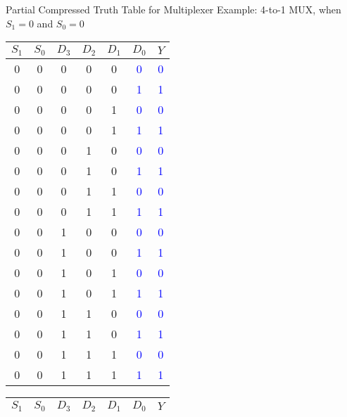 \begin{frame}{Partial Compressed Truth Table for Multiplexer}
Example: 4-to-1 MUX, when $S_1 = 0$ and $S_0 = 0$
\begin{multicols}{2}
    \begin{center}
\small
		\begin{tabular}{cc|cccc|c}
		 $S_1$ & $S_0$ & $D_3$ & $D_2$ &$D_1$ & $D_0$ & $Y$\\\hline
		
   0 & 0 & 0 & 0 & 0 & \textcolor{blue}{0} & \textcolor{blue}{0} \\
   0 & 0 & 0 & 0 & 0 & \textcolor{blue}{1} & \textcolor{blue}{1} \\
   0 & 0 & 0 & 0 & 1 & \textcolor{blue}{0} & \textcolor{blue}{0} \\
   0 & 0 & 0 & 0 & 1& \textcolor{blue}{1} & \textcolor{blue}{1} \\
   0 & 0 & 0 & 1 & 0 & \textcolor{blue}{0} & \textcolor{blue}{0} \\
    0 & 0 & 0 & 1 & 0 & \textcolor{blue}{1} & \textcolor{blue}{1} \\
    0 & 0 & 0 & 1 & 1 & \textcolor{blue}{0} & \textcolor{blue}{0} \\
    0 & 0 & 0 & 1 & 1 & \textcolor{blue}{1} & \textcolor{blue}{1} \\
   \hline
   0 & 0 & 1 & 0 & 0 & \textcolor{blue}{0} & \textcolor{blue}{0} \\
   0 & 0 & 1 & 0 & 0 & \textcolor{blue}{1} & \textcolor{blue}{1} \\
   0 & 0 & 1 & 0 & 1 & \textcolor{blue}{0} & \textcolor{blue}{0} \\
   0 & 0 & 1 & 0 & 1& \textcolor{blue}{1} & \textcolor{blue}{1} \\
   0 & 0 & 1 & 1 & 0 & \textcolor{blue}{0} & \textcolor{blue}{0} \\
    0 & 0 & 1 & 1 & 0 & \textcolor{blue}{1} & \textcolor{blue}{1} \\
    0 & 0 & 1 & 1 & 1 & \textcolor{blue}{0} & \textcolor{blue}{0} \\
    0 & 0 & 1 & 1 & 1 & \textcolor{blue}{1} & \textcolor{blue}{1} \\
    \hline
		\end{tabular}
		\end{center}

  \columnbreak

   \begin{center}
\small
		\begin{tabular}{cc|cccc|c}
		 $S_1$ & $S_0$ & $D_3$ & $D_2$ &$D_1$ & $D_0$ & $Y$\\\hline
		

\end{tabular}
\end{center}
\end{multicols}
\end{frame}
